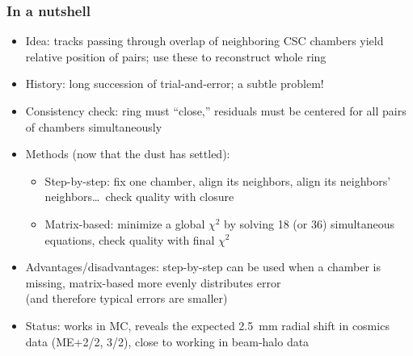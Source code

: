 \documentclass[compress]{beamer}
\begin{document}
\begin{frame}
\frametitle{In a nutshell}
\small
\begin{itemize}\setlength{\itemsep}{0.15 cm}
\item Idea: tracks passing through overlap of neighboring CSC chambers yield relative position of pairs; use these to reconstruct whole ring
\item History: long succession of trial-and-error; a subtle problem!
\item Consistency check: ring must ``close,'' residuals must be centered for all pairs of chambers simultaneously
\item Methods (now that the dust has settled):
\begin{itemize}
\item Step-by-step: fix one chamber, align its neighbors, align its neighbors' neighbors\ldots\ check quality with closure
\item Matrix-based: minimize a global $\chi^2$ by solving 18 (or 36) simultaneous equations, check quality with final $\chi^2$
\end{itemize}
\item Advantages/disadvantages: step-by-step can be used when a chamber is
  missing, matrix-based more evenly distributes error \\ (and therefore typical
  errors are smaller)
\item Status: works in MC, reveals the expected 2.5~mm radial shift in cosmics data (ME+2/2, 3/2), close to working in beam-halo data
\end{itemize}
\end{frame}

\end{document}
